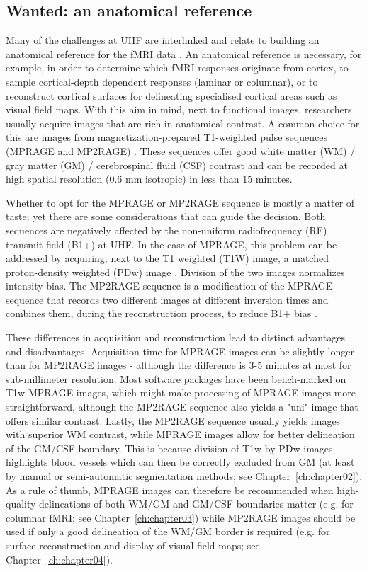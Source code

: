 \subsection{Wanted: an anatomical reference}
Many of the challenges at UHF are interlinked and relate to building an anatomical reference for the fMRI data \parencite{Polimeni2017}. An anatomical reference is necessary, for example, in order to determine which fMRI responses originate from cortex, to sample cortical-depth dependent responses (laminar or columnar), or to reconstruct cortical surfaces for delineating specialised cortical areas such as visual field maps. With this aim in mind, next to functional images, researchers usually acquire images that are rich in anatomical contrast. A common choice for this are images from magnetization-prepared T1-weighted pulse sequences (MPRAGE and MP2RAGE) \parencite{Mugler1990, Moortele2009, Marques2010}. These sequences offer good white matter (WM) / gray matter (GM) / cerebrospinal fluid (CSF) contrast and can be recorded at high spatial resolution (0.6 mm isotropic) in less than 15 minutes.

Whether to opt for the MPRAGE or MP2RAGE sequence is mostly a matter of taste; yet there are some considerations that can guide the decision. Both sequences are negatively affected by the non-uniform radiofrequency (RF) transmit field (B1+) at UHF. In the case of MPRAGE, this problem can be addressed by acquiring, next to the T1 weighted (T1W) image, a matched proton-density weighted (PDw) image \parencite{Moortele2009}. Division of the two images normalizes intensity bias. The MP2RAGE sequence is a modification of the MPRAGE sequence that records two different images at different inversion times and combines them, during the reconstruction process, to reduce B1+ bias \parencite{Marques2010}.

These differences in acquisition and reconstruction lead to distinct advantages and disadvantages. Acquisition time for MPRAGE images can be slightly longer than for MP2RAGE images - although the difference is 3-5 minutes at most for sub-millimeter resolution. Most software packages have been bench-marked on T1w MPRAGE images, which might make processing of MPRAGE images more straightforward, although the MP2RAGE sequence also yields a "uni" image that offers similar contrast. Lastly, the MP2RAGE sequence usually yields images with superior WM contrast, while MPRAGE images allow for better delineation of the GM/CSF boundary. This is because division of T1w by PDw images highlights blood vessels \parencite{Moortele2009} which can then be correctly excluded from GM (at least by manual or semi-automatic segmentation methods; see Chapter~\ref{ch:chapter02}). As a rule of thumb, MPRAGE images can therefore be recommended when high-quality delineations of both WM/GM and GM/CSF boundaries matter (e.g. for columnar fMRI; see Chapter~\ref{ch:chapter03}) while MP2RAGE images should be used if only a good delineation of the WM/GM border is required (e.g. for surface reconstruction and display of visual field maps; see Chapter~\ref{ch:chapter04}).

